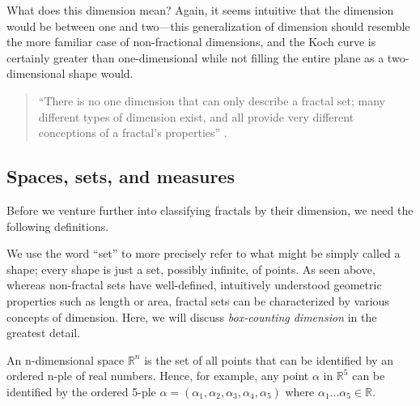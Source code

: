 \begin{myremark}What does this dimension mean? Again, it seems intuitive that the dimension would be between one and two---this generalization of dimension should resemble the more familiar case of non-fractional dimensions, and the Koch curve is certainly greater than one-dimensional while not filling the entire plane as a two-dimensional shape would. \end{myremark}

\begin{quote}
``There is no one dimension that can only describe a fractal set; many different types of dimension exist, and all provide very different conceptions of a fractal's properties'' \citep{fractaltextbook}.
\end{quote}

\subsection{Spaces, sets, and measures}
Before we venture further into classifying fractals by their dimension, we need the following definitions.

We use the word ``set'' to more precisely refer to what might be simply called a shape; every shape is just a set, possibly infinite, of points. As seen above, whereas non-fractal sets have well-defined, intuitively understood geometric properties such as length or area, fractal sets can be characterized by various concepts of dimension. Here, we will discuss \textit{box-counting dimension} in the greatest detail.

\begin{mydef}
An n-dimensional space $ \mathbb{R}^{n} $ is the set of all points that can be identified by an ordered n-ple of real numbers. Hence, for example, any point $ \alpha $ in $ \mathbb{R}^{5} $ can be identified by the ordered 5-ple $ \alpha = (\alpha_{1}, \alpha_{2}, \alpha_{3}, \alpha_{4}, \alpha_{5})$ where $ \alpha_{1} ... \alpha_{5} \in \mathbb{R} $.\end{mydef}


